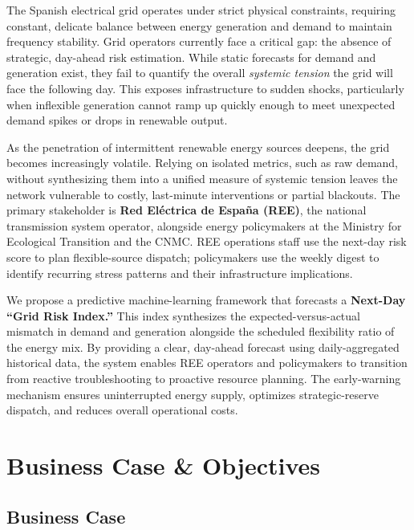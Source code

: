 \documentclass[11pt, a4paper]{article}
\begin{document}
The Spanish electrical grid operates under strict physical constraints,
requiring constant, delicate balance between energy generation and demand
to maintain frequency stability. Grid operators currently face a critical
gap: the absence of strategic, day-ahead risk estimation. While static
forecasts for demand and generation exist, they fail to quantify the
overall \textit{systemic tension} the grid will face the following day.
This exposes infrastructure to sudden shocks, particularly when inflexible
generation cannot ramp up quickly enough to meet unexpected demand spikes
or drops in renewable output.

As the penetration of intermittent renewable energy sources deepens, the
grid becomes increasingly volatile. Relying on isolated metrics, such as
raw demand, without synthesizing them into a unified measure of systemic
tension leaves the network vulnerable to costly, last-minute interventions
or partial blackouts. The primary stakeholder is \textbf{Red Eléctrica de
España (REE)}, the national transmission system operator, alongside energy policymakers at the Ministry for Ecological Transition and the CNMC. REE operations staff use the next-day risk score to plan flexible-source dispatch; policymakers use the weekly digest to identify recurring stress patterns and their infrastructure implications.

We propose a predictive machine-learning framework that forecasts a
\textbf{Next-Day ``Grid Risk Index.''}  This index synthesizes the
expected-versus-actual mismatch in demand and generation alongside the
scheduled flexibility ratio of the energy mix. By providing a clear,
day-ahead forecast using daily-aggregated historical data, the system
enables REE operators and policymakers to transition from reactive
troubleshooting to proactive resource planning. The early-warning
mechanism ensures uninterrupted energy supply, optimizes strategic-reserve
dispatch, and reduces overall operational costs.

\section{Business Case \& Objectives}

\subsection{Business Case}
\end{document}
